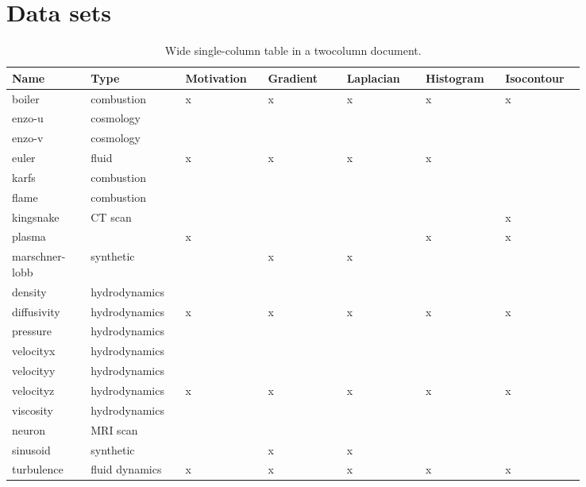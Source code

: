 \section{Data sets}

\begin{table*}[ht]
  \caption{Wide single-column table in a twocolumn document.}
  \centering
  \begin{tabular}{p{0.12\linewidth}p{0.12\linewidth}p{0.12\linewidth}p{0.12\linewidth}p{0.12\linewidth}p{0.12\linewidth}p{0.12\linewidth}}
  \hline
  Name & Type & Motivation & Gradient & Laplacian & Histogram & Isocontour\\
  \hline
  boiler & combustion & x & x & x & x & x \\
  enzo-u & cosmology & & & & & \\
  enzo-v & cosmology & & & & & \\
  euler & fluid & x & x & x & x & \\
  karfs & combustion & & & & & \\
  flame & combustion & & & & & \\
  kingsnake & CT scan & & & & & x \\
  plasma &  & x & & & x & x \\
  marschner-lobb & synthetic & & x & x & & \\
  density & hydrodynamics & & & & & \\
  diffusivity & hydrodynamics & x & x & x & x & x \\
  pressure & hydrodynamics & & & & & \\
  velocityx & hydrodynamics & & & & & \\
  velocityy & hydrodynamics & & & & & \\
  velocityz & hydrodynamics & x & x & x & x & x \\
  viscosity & hydrodynamics & & & & & \\
  neuron & MRI scan & & & & & \\
  sinusoid & synthetic & & x & x & & \\
  turbulence & fluid dynamics & x & x & x & x & x \\
  \hline
  \end{tabular}
\end{table*}
